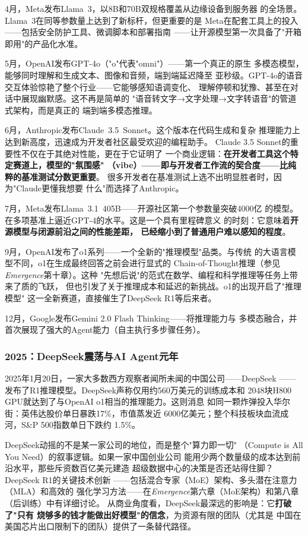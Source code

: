 4月，Meta发布Llama~3，以8B和70B双规格覆盖从边缘设备到服务器
的全场景。Llama~3在同等参数量上达到了新标杆，但更重要的是
Meta在配套工具上的投入——包括安全防护工具、微调脚本和部署指南
——让开源模型第一次具备了"开箱即用"的产品化水准。

5月，OpenAI发布GPT-4o（"o"代表"omni"）——第一个真正的原生
多模态模型，能够同时理解和生成文本、图像和音频，端到端延迟降至
亚秒级。GPT-4o的语音交互体验惊艳了整个行业——它能够感知语调变化、
理解停顿和犹豫、甚至在对话中展现幽默感。这不再是简单的
"语音转文字→文字处理→文字转语音"的管道式架构，而是真正的
端到端多模态推理。

6月，Anthropic发布Claude~3.5~Sonnet。这个版本在代码生成和复杂
推理能力上达到新高度，迅速成为开发者社区最受欢迎的编程助手。
Claude 3.5 Sonnet的重要性不仅在于其绝对性能，更在于它证明了
一个商业逻辑：\textbf{在开发者工具这个特定赛道上，模型的"氛围感"
（vibe）——即与开发者工作流的契合度——比纯粹的基准测试分数更重要}。
很多开发者在基准测试上选不出明显胜者时，因为"Claude更懂我想要
什么"而选择了Anthropic。

7月，Meta发布Llama~3.1~405B——开源社区第一个参数量突破4000亿
的模型。在多项基准上逼近GPT-4的水平。这是一个具有里程碑意义
的时刻：它意味着\textbf{开源模型与闭源前沿之间的性能差距，
已经缩小到了普通用户难以感知的程度}。

9月，OpenAI发布了o1系列——一个全新的"推理模型"品类。与传统
的大语言模型不同，o1在生成最终回答之前会进行显式的
Chain-of-Thought推理（参见\textit{Emergence}第十章）。这种
"先想后说"的范式在数学、编程和科学推理等任务上带来了质的飞跃，
但也引发了关于推理成本和延迟的新挑战。o1的出现开启了"推理模型"
这一全新赛道，直接催生了DeepSeek R1等后来者。

12月，Google发布Gemini 2.0 Flash Thinking——将推理能力与
多模态融合，并首次展现了强大的Agent能力（自主执行多步骤任务）。

\subsubsection{2025：DeepSeek震荡与AI Agent元年}
2025年1月20日，一家大多数西方观察者闻所未闻的中国公司——DeepSeek
——发布了R1推理模型。DeepSeek声称仅用约560万美元的训练成本和
2048块H800 GPU就达到了与OpenAI o1相当的推理能力。这则消息
如同一颗炸弹投入华尔街：英伟达股价单日暴跌17\%，市值蒸发近
6000亿美元；整个科技板块血流成河，S\&P 500指数单日下跌约
1.5\%。

DeepSeek动摇的不是某一家公司的地位，而是整个"算力即一切"
（Compute is All You Need）的叙事逻辑。如果一家中国创业公司
能用少两个数量级的成本达到前沿水平，那些斥资数百亿美元建造
超级数据中心的决策是否还站得住脚？DeepSeek R1的关键技术创新
——包括混合专家（MoE）架构、多头潜在注意力（MLA）和高效的
强化学习方法——在\textit{Emergence}第六章（MoE架构）和第八章（后训练）中有详细讨论。
从商业角度看，DeepSeek最深远的影响是：它\textbf{打破了"只有
烧够多的钱才能做出好模型"的信念}，为资源有限的团队（尤其是
中国在美国芯片出口限制下的团队）提供了一条替代路径。

